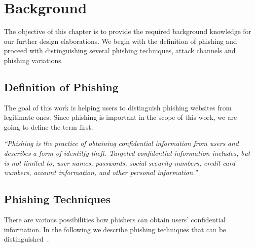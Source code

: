 \section{Background}
\label{s:background}
The objective of this chapter is to provide the required background knowledge for our further design elaborations. We begin with the definition of phishing and proceed with distinguishing several phishing techniques, attack channels and phishing variations.
\subsection{Definition of Phishing}
\label{s:phishing_def}
The goal of this work is helping users to distinguish phishing websites from legitimate ones. Since phishing is important in the scope of this work, we are going to define the term first. 

\begin{center}
\textit{``Phishing is the practice of obtaining confidential information from users and describes a form of identitfy theft. Targeted confidential information includes, but is not limited to, user names, passwords, social security numbers, credit card numbers, account information, and other personal information.''}~\cite{jakobsson2006phishing}
\end{center}

\subsection{Phishing Techniques}
\label{s:phishing_techs}
There are various possibilities how phishers can obtain users' confidential information. In the following we describe phishing techniques that can be distinguished~\cite{jakobsson2006phishing}.

